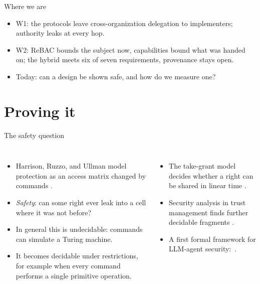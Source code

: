 \documentclass[aspectratio=169, 10pt]{beamer}
\begin{document}
\begin{frame}{Where we are}
  \begin{itemize}\small
    \item W1: the protocols leave cross-organization delegation to implementers; authority leaks at every hop.
    \item W2: ReBAC bounds the subject now, capabilities bound what was handed on; the hybrid meets six of seven requirements, provenance stays open.
    \item Today: can a design be shown safe, and how do we measure one?
  \end{itemize}
\end{frame}

\section{Proving it}

\begin{frame}{The safety question}
  \begin{columns}[T]
    \begin{itemize}\small
      \item Harrison, Ruzzo, and Ullman model protection as an access matrix changed by commands .
      \item \emph{Safety}: can some right ever leak into a cell where it was not before?
      \item In general this is undecidable: commands can simulate a Turing machine.
      \item It becomes decidable under restrictions, for example when every command performs a single primitive operation.
    \end{itemize}
    \begin{itemize}\small
      \item The take-grant model decides whether a right can be shared in linear time .
      \item Security analysis in trust management finds further decidable fragments .
      \item A first formal framework for LLM-agent security: \,\pre.
    \end{itemize}
  \end{columns}
\end{frame}
\end{document}
